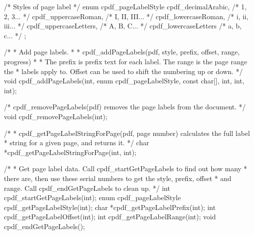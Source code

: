 /* Styles of page label */
enum cpdf_pageLabelStyle {
  cpdf_decimalArabic,    /* 1, 2, 3... */
  cpdf_uppercaseRoman,   /* I, II, III... */
  cpdf_lowercaseRoman,   /* i, ii, iii... */
  cpdf_uppercaseLetters, /* A, B, C... */
  cpdf_lowercaseLetters  /* a, b, c... */
};

/*
 * Add page labels.
 *
 * cpdf_addPageLabels(pdf, style, prefix, offset, range, progress)
 *
 * The prefix is prefix text for each label. The range is the page range the
 * labels apply to. Offset can be used to shift the numbering up or down.
 */
void cpdf_addPageLabels(int, enum cpdf_pageLabelStyle, const char[], int, int,
                        int);

/* cpdf_removePageLabels(pdf) removes the page labels from the document. */
void cpdf_removePageLabels(int);

/*
 * cpdf_getPageLabelStringForPage(pdf, page number) calculates the full label
 * string for a given page, and returns it.
 */
char *cpdf_getPageLabelStringForPage(int, int);

/*
 * Get page label data. Call cpdf_startGetPageLabels to find out how many
 * there are, then use these serial numbers to get the style, prefix, offset
 * and range. Call cpdf_endGetPageLabels to clean up.
 */
int cpdf_startGetPageLabels(int);
enum cpdf_pageLabelStyle cpdf_getPageLabelStyle(int);
char *cpdf_getPageLabelPrefix(int);
int cpdf_getPageLabelOffset(int);
int cpdf_getPageLabelRange(int);
void cpdf_endGetPageLabels();

